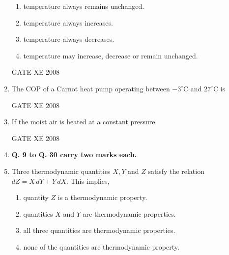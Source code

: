 \documentclass[12pt]{article}
\begin{document}
\begin{enumerate}[label=Q\arabic*.]
\begin{enumerate}[label=(\Alph*)]
\item  temperature always remains unchanged.
\item  temperature always increases.
\item  temperature always decreases.
\item  temperature may increase, decrease or remain unchanged.  
\end{enumerate}
GATE XE 2008

\item The COP of a Carnot heat pump operating between $-3^\circ\mathrm{C}$ and $27^\circ\mathrm{C}$ is  

\begin{enumerate}[label=(\Alph*)]
\end{enumerate}

GATE XE 2008

\item If the moist air is heated at a constant pressure  

\begin{enumerate}[label=(\Alph*)]
\end{enumerate}

GATE XE 2008

\item[] \textbf{Q. 9 to Q. 30 carry two marks each.}

\item Three thermodynamic quantities $X, Y$ and $Z$ satisfy the relation  
$dZ = X\, dY + Y\, dX.$
This implies,  
\begin{enumerate}[label=(\Alph*)]
\item  quantity $Z$ is a thermodynamic property.
\item  quantities $X$ and $Y$ are thermodynamic properties. 
\item  all three quantities are thermodynamic properties. 
\item  none of the quantities are thermodynamic property. 
\end{enumerate}


\end{enumerate}
\end{document}
